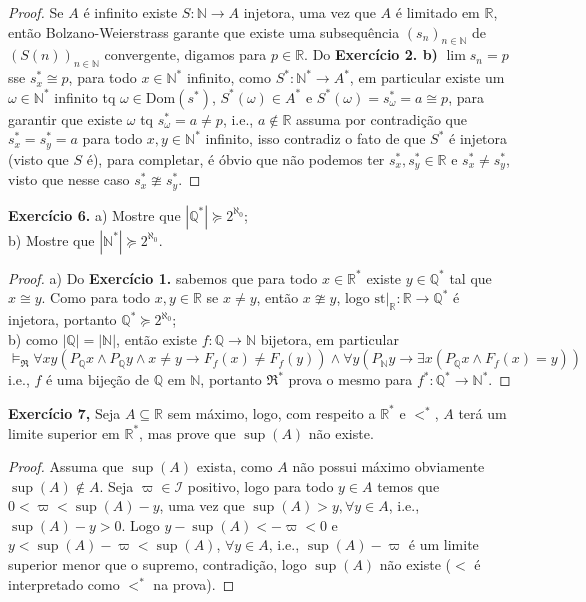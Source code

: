 \documentclass[11pt]{article}
\newcommand{\mc}[1]{\mathcal{#1}}
\newcommand{\mf}[1]{\mathfrak{#1}}
\newcommand{\mbb}[1]{\mathbb{#1}}
\begin{document}
\begin{proof}
    Se $A$ é infinito existe $S:\mbb{N}\to A$ injetora, uma vez que $A$ é limitado em $\mbb{R}$, então Bolzano-Weierstrass garante que existe uma subsequência $(s_n)_{n\in\mbb{N}}$ de $(S(n))_{n\in\mbb{N}}$ convergente, digamos para $p\in\mbb{R}$. Do \textbf{Exercício 2. b)} $\lim s_n=p$ sse $s^*_x\cong p$, para todo $x\in\mbb{N}^*$ infinito, como $S^*:\mbb{N}^*\to A^*$, em particular existe um $\omega\in\mbb{N}^*$ infinito tq $\omega\in\text{Dom}(s^*)$, $S^*(\omega)\in A^*$ e $S^*(\omega)=s^*_\omega=a\cong p$, para garantir que existe $\omega$ tq $s^*_\omega=a\neq p$, i.e., $a\notin\mbb{R}$ assuma por contradição que $s_x^*=s_y^*=a$ para todo $x,y\in\mbb{N}^*$ infinito, isso contradiz o fato de que $S^*$ é injetora (visto que $S$ é), para completar, é óbvio que não podemos ter $s^*_x,s^*_y\in\mbb{R}$ e $s^*_x\neq s^*_y$, visto que nesse caso $s^*_x\ncong s^*_y$.
\end{proof}

\begin{shaded}
\textbf{Exercício 6.} a) Mostre que $|\mbb{Q}^*|\succeq2^{\aleph_0}$;\\
b) Mostre que $|\mbb{N}^*|\succeq2^{\aleph_0}$.
\end{shaded}

\begin{proof}
    a) Do \textbf{Exercício 1.} sabemos que para todo $x\in\mbb{R}^*$ existe $y\in\mbb{Q}^*$ tal que $x\cong y$. Como para todo $x,y\in\mbb{R}$ se $x\neq y$, então $x\ncong y$, logo $\text{st}\vert_{\mbb{R}}:\mbb{R}\to\mbb{Q}^*$ é injetora, portanto $\mbb{Q}^*\succeq2^{\aleph_0}$;\\
    b) como $|\mbb{Q}|=|\mbb{N}|$, então existe $f:\mbb{Q}\to\mbb{N}$ bijetora, em particular
    $$\vDash_\mf{R}\forall xy(P_\mbb{Q}x\wedge P_\mbb{Q}y\wedge x\neq y\to F_f(x)\neq F_f(y))\wedge\forall y(P_\mbb{N}y\to\exists x(P_\mbb{Q}x\wedge F_f(x)=y))$$
    i.e., $f$ é uma bijeção de $\mbb{Q}$ em $\mbb{N}$, portanto $\mf{R}^*$ prova o mesmo para $f^*:\mbb{Q}^*\to\mbb{N}^*$.
\end{proof}

\begin{shaded}
\textbf{Exercício 7,} Seja $A\subseteq\mbb{R}$ sem máximo, logo, com respeito a $\mbb{R}^*$ e $<^*$, $A$ terá um limite superior em $\mbb{R}^*$, mas prove que $\sup(A)$ não existe.
\end{shaded}

\begin{proof}
    Assuma que $\sup(A)$ exista, como $A$ não possui máximo obviamente $\sup(A)\notin A$. Seja $\varpi\in\mc{I}$ positivo, logo para todo $y\in A$ temos que $0<\varpi<\sup(A)-y$, uma vez que $\sup(A)> y, \forall y\in A$, i.e., $\sup(A)-y>0$. Logo $y-\sup(A)<-\varpi<0$ e $y<\sup(A)-\varpi<\sup(A)$, $\forall y\in A$, i.e., $\sup(A)-\varpi$ é um limite superior menor que o supremo, contradição, logo $\sup(A)$ não existe ($<$ é interpretado como $<^*$ na prova).
\end{proof}
\end{document}
